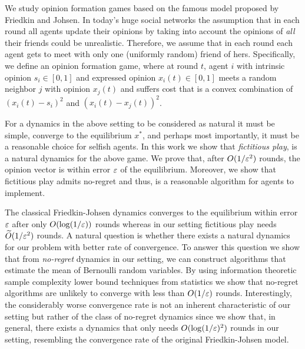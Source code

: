 We study opinion formation games based on the famous model proposed by Friedkin
and Johsen.  In today's huge social networks the assumption that in each round
all agents update their opinions by taking into account the opinions of
\emph{all} their friends could be unrealistic. Therefore, we assume that in
each round each agent gets to meet with only one (uniformly random) friend of
hers.  Specifically, we define an opinion formation game, where at round $t$,
agent $i$ with intrinsic opinion $s_i\in[0,1]$ and expressed opinion $x_i(t)
\in[0,1]$ meets a random neighbor $j$ with opinion $x_j(t)$ and suffers cost
that is a convex combination of $(x_i(t) - s_i)^2$ and $(x_i(t) - x_j(t))^2$.

For a dynamics in the above setting to be considered as natural it must be
simple, converge to the equilibrium $x^*$, and perhaps most importantly, it
must be a reasonable choice for selfish agents.  In this work we show that
\emph{fictitious play}, is a natural dynamics for the above game.  We prove
that, after $O(1/\varepsilon^2)$ rounds, the opinion vector is within error $\varepsilon$  of
the equilibrium. Moreover, we show that fictitious play admits no-regret and
thus, is a reasonable algorithm for agents to implement.

The classical Friedkin-Johsen dynamics converges to the equilibrium within
error $\varepsilon$ after only $O(\log(1/\varepsilon))$ rounds whereas in our setting
fictitious play needs $\widetilde{O}(1/\varepsilon^2)$ rounds. A natural question is
whether there exists a natural dynamics for our problem with better rate of
convergence.  To answer this question we show that from \emph{no-regret}
dynamics in our setting, we can construct algorithms that estimate the mean of
Bernoulli random variables.  By using information theoretic sample complexity
lower bound techniques from statistics we show that no-regret algorithms are
unlikely to converge with less than $O(1/\varepsilon)$ rounds. Interestingly, the
considerably worse convergence rate is not an inherent characteristic of our
setting but rather of the class of no-regret dynamics since we show that, in
general, there exists a dynamics that only needs $O(\log(1/\varepsilon)^2)$ rounds in
our setting, resembling the convergence rate of the original Friedkin-Johsen
model.
